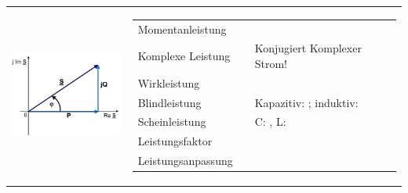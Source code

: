 	\begin{tabular}{ll}
   		\parbox{4cm}{
   			\includegraphics[width=4cm]{./images/zeigerdiag-leistungen.png}}
   		& \parbox{14cm}{
			\begin{tabular}{p{3cm}p{5cm}p{5.5cm}}
	      		Momentanleistung
	      			& $p(t) = u(t) i(t)$
	      			\\
				Komplexe Leistung 
					& $ \underline{S} = \underline{U} \cdot \underline{I}^\ast = U\cdot I \cdot
					e^{j(\varphi_u-\varphi_i)}$  & Konjugiert Komplexer Strom! \\
				Wirkleistung
					& $ P = \Real(\underline{S}) = U I \cos(\varphi) $ \\
				Blindleistung 
					& $ Q = \Imag(\underline{S}) = U I \sin(\varphi) $
					& Kapazitiv: $Q < 0$; induktiv: $Q > 0$ \\
				Scheinleistung
					& $ S = | \underline{S} | = U I = \frac{U^2}{R} = I^2 R$ 
					& C: $Q_c=-\omega CU_C^2$, L: $Q_L=\omega LI_L^2$\\
				Leistungsfaktor
					& $\cos \varphi = \frac{P}{S} = \frac{P}{UI}$ \\
				Leistungsanpassung
					& $\underline{Z}_L = \underline{Z}_i^{\ast}; \; P_{max} = \frac{U_q^2}{4
					R_i} = \frac{I_q^2 R_i}{4} $
			\end{tabular}}
   	\end{tabular}

